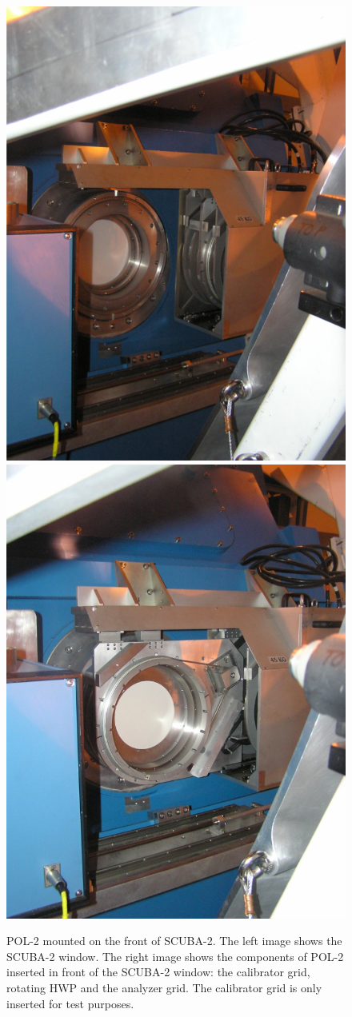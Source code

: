 \begin{figure}[t!]
\begin{center}
\includegraphics[width=0.45\linewidth]{pol2-out-of-beam.png}
\includegraphics[width=0.45\linewidth]{pol2-in-beam.png}
\label{fig:pol2sc2}
\caption [POL-2 mounted on SCUBA-2]{
  \small POL-2 mounted on the front of SCUBA-2.
  The left image shows the SCUBA-2
  window. The right image shows the components of POL-2 inserted
  in front of the SCUBA-2 window: the calibrator grid, rotating HWP
  and the analyzer grid. The calibrator grid is only inserted
  for test purposes.}
\end{center}
\end{figure}


